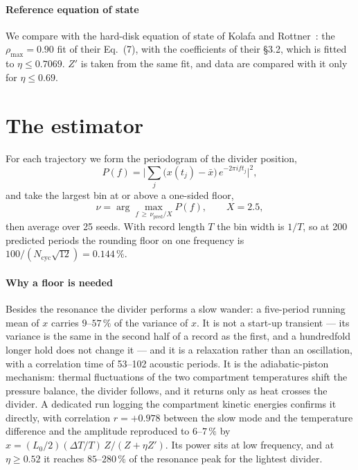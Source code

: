 \documentclass[journal]{IEEEtran}
\begin{document}
\paragraph{Reference equation of state} We compare with the hard-disk equation of state of Kolafa and
Rottner~\cite{kolafa2006}: the $\rho_{\max} = 0.90$ fit of their Eq.~(7), with the coefficients of their \S3.2, which is
fitted to $\eta \le 0.7069$. $Z'$ is taken from the same fit, and data are compared with it only for
$\eta \le 0.69$.

\section{The estimator}\label{sec:estimator}
For each trajectory we form the periodogram of the divider position,
\begin{equation}
P(f) = \Big|\sum_j \big(x(t_j) - \bar x\big)\,e^{-2\pi i f t_j}\Big|^2 ,
\end{equation}
and take the largest bin at or above a one-sided floor,
\begin{equation}
\nu = \arg\max_{f \,\ge\, \nu_{\mathrm{pred}}/X} P(f), \qquad X = 2.5 ,
\label{eq:estimator}
\end{equation}
then average over 25 seeds. With record length $T$ the bin width is $1/T$, so at 200 predicted
periods the rounding floor on one frequency is $100/(N_{\mathrm{cyc}}\sqrt{12}) = 0.144\,\%$.

\paragraph{Why a floor is needed} Besides the resonance the divider performs a slow wander: a
five-period running mean of $x$ carries $9$--$57\,\%$ of the variance of $x$. It is not a start-up
transient --- its variance is the same in the second half of a record as the first, and a
hundredfold longer hold does not change it --- and it is a relaxation rather than an oscillation,
with a correlation time of 53--102 acoustic periods. It is the adiabatic-piston mechanism: thermal
fluctuations of the two compartment temperatures shift the pressure balance, the divider follows,
and it returns only as heat crosses the divider. A dedicated run logging the compartment kinetic
energies confirms it directly, with correlation $r = +0.978$ between the slow mode and the
temperature difference and the amplitude reproduced to $6$--$7\,\%$ by
$x = (L_0/2)(\Delta T/T)\,Z/(Z+\eta Z')$. Its power sits at low frequency, and at $\eta \ge 0.52$ it
reaches $85$--$280\,\%$ of the resonance peak for the lightest divider.
\end{document}
